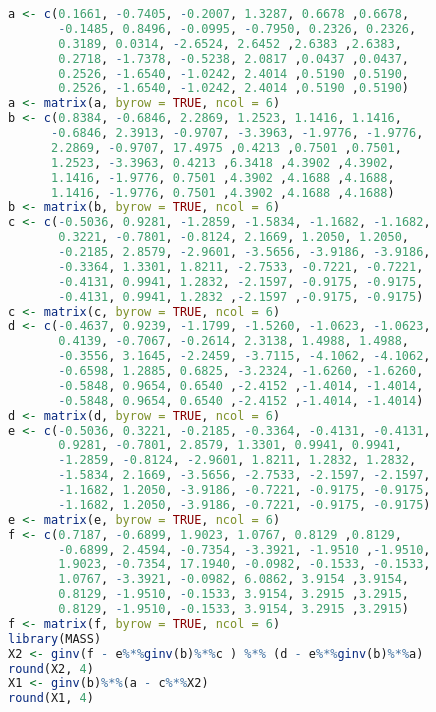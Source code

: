 \documentclass[paper=letter, fontsize=11pt]{scrartcl}
\numberwithin{equation}{section} %
\numberwithin{figure}{section} %
\numberwithin{table}{section} %
\begin{document}
\begin{enumerate}
\begin{enumerate}
\begin{lstlisting}[style=customc,basicstyle=\scriptsize, language=R]
a <- c(0.1661, -0.7405, -0.2007, 1.3287, 0.6678 ,0.6678,
       -0.1485, 0.8496, -0.0995, -0.7950, 0.2326, 0.2326,
       0.3189, 0.0314, -2.6524, 2.6452 ,2.6383 ,2.6383,
       0.2718, -1.7378, -0.5238, 2.0817 ,0.0437 ,0.0437,
       0.2526, -1.6540, -1.0242, 2.4014 ,0.5190 ,0.5190,
       0.2526, -1.6540, -1.0242, 2.4014 ,0.5190 ,0.5190)
a <- matrix(a, byrow = TRUE, ncol = 6)
b <- c(0.8384, -0.6846, 2.2869, 1.2523, 1.1416, 1.1416,
      -0.6846, 2.3913, -0.9707, -3.3963, -1.9776, -1.9776,
      2.2869, -0.9707, 17.4975 ,0.4213 ,0.7501 ,0.7501,
      1.2523, -3.3963, 0.4213 ,6.3418 ,4.3902 ,4.3902,
      1.1416, -1.9776, 0.7501 ,4.3902 ,4.1688 ,4.1688,
      1.1416, -1.9776, 0.7501 ,4.3902 ,4.1688 ,4.1688)
b <- matrix(b, byrow = TRUE, ncol = 6)
c <- c(-0.5036, 0.9281, -1.2859, -1.5834, -1.1682, -1.1682,
       0.3221, -0.7801, -0.8124, 2.1669, 1.2050, 1.2050,
       -0.2185, 2.8579, -2.9601, -3.5656, -3.9186, -3.9186,
       -0.3364, 1.3301, 1.8211, -2.7533, -0.7221, -0.7221,
       -0.4131, 0.9941, 1.2832, -2.1597, -0.9175, -0.9175,
       -0.4131, 0.9941, 1.2832 ,-2.1597 ,-0.9175, -0.9175)
c <- matrix(c, byrow = TRUE, ncol = 6)
d <- c(-0.4637, 0.9239, -1.1799, -1.5260, -1.0623, -1.0623,
       0.4139, -0.7067, -0.2614, 2.3138, 1.4988, 1.4988,
       -0.3556, 3.1645, -2.2459, -3.7115, -4.1062, -4.1062,
       -0.6598, 1.2885, 0.6825, -3.2324, -1.6260, -1.6260,
       -0.5848, 0.9654, 0.6540 ,-2.4152 ,-1.4014, -1.4014,
       -0.5848, 0.9654, 0.6540 ,-2.4152 ,-1.4014, -1.4014)
d <- matrix(d, byrow = TRUE, ncol = 6)
e <- c(-0.5036, 0.3221, -0.2185, -0.3364, -0.4131, -0.4131,
       0.9281, -0.7801, 2.8579, 1.3301, 0.9941, 0.9941,
       -1.2859, -0.8124, -2.9601, 1.8211, 1.2832, 1.2832,
       -1.5834, 2.1669, -3.5656, -2.7533, -2.1597, -2.1597,
       -1.1682, 1.2050, -3.9186, -0.7221, -0.9175, -0.9175,
       -1.1682, 1.2050, -3.9186, -0.7221, -0.9175, -0.9175)
e <- matrix(e, byrow = TRUE, ncol = 6)
f <- c(0.7187, -0.6899, 1.9023, 1.0767, 0.8129 ,0.8129,
       -0.6899, 2.4594, -0.7354, -3.3921, -1.9510 ,-1.9510,
       1.9023, -0.7354, 17.1940, -0.0982, -0.1533, -0.1533,
       1.0767, -3.3921, -0.0982, 6.0862, 3.9154 ,3.9154,
       0.8129, -1.9510, -0.1533, 3.9154, 3.2915 ,3.2915,
       0.8129, -1.9510, -0.1533, 3.9154, 3.2915 ,3.2915)
f <- matrix(f, byrow = TRUE, ncol = 6)
library(MASS)
X2 <- ginv(f - e%*%ginv(b)%*%c ) %*% (d - e%*%ginv(b)%*%a)
round(X2, 4)
X1 <- ginv(b)%*%(a - c%*%X2)
round(X1, 4)

\end{lstlisting}  


\end{enumerate}
\end{enumerate}
\end{document}
